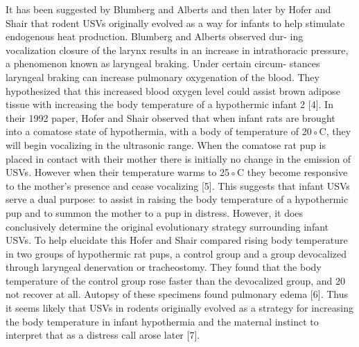 \documentclass[12pt, letter]{report}
\begin{document}
It has been suggested by Blumberg and Alberts and then later by Hofer
and Shair that rodent USVs originally evolved as a way for infants to help
stimulate endogenous heat production. Blumberg and Alberts observed dur-
ing vocalization closure of the larynx results in an increase in intrathoracic
pressure, a phenomenon known as laryngeal braking. Under certain circum-
stances laryngeal braking can increase pulmonary oxygenation of the blood.
They hypothesized that this increased blood oxygen level could assist brown
adipose tissue with increasing the body temperature of a hypothermic infant
2
[4]. In their 1992 paper, Hofer and Shair observed that when infant rats are
brought into a comatose state of hypothermia, with a body of temperature of
20◦C, they will begin vocalizing in the ultrasonic range. When the comatose
rat pup is placed in contact with their mother there is initially no change in
the emission of USVs. However when their temperature warms to 25◦C they
become responsive to the mother’s presence and cease vocalizing [5]. This
suggests that infant USVs serve a dual purpose: to assist in raising the body
temperature of a hypothermic pup and to summon the mother to a pup in
distress. However, it does conclusively determine the original evolutionary
strategy surrounding infant USVs. To help elucidate this Hofer and Shair
compared rising body temperature in two groups of hypothermic rat pups,
a control group and a group devocalized through laryngeal denervation or
tracheostomy. They found that the body temperature of the control group
rose faster than the devocalized group, and 20%
not recover at all. Autopsy of these specimens found pulmonary edema [6].
Thus it seems likely that USVs in rodents originally evolved as a strategy
for increasing the body temperature in infant hypothermia and the maternal
instinct to interpret that as a distress call arose later [7].
\end{document}
